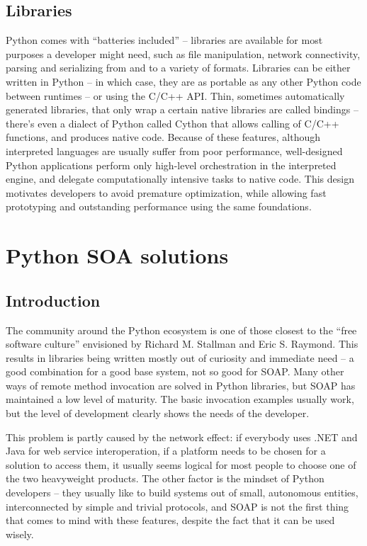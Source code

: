 \subsection{Libraries}

Python comes with ``batteries included'' -- libraries are available for most purposes a developer might need, such as file manipulation, network connectivity, parsing and serializing from and to a variety of formats. Libraries can be either written in Python -- in which case, they are as portable as any other Python code between runtimes -- or using the C/C++ API. Thin, sometimes automatically generated libraries, that only wrap a certain native libraries are called bindings -- there's even a dialect of Python called Cython that allows calling of C/C++ functions, and produces native code. Because of these features, although interpreted languages are usually suffer from poor performance, well-designed Python applications perform only high-level orchestration in the interpreted engine, and delegate computationally intensive tasks to native code. This design motivates developers to avoid premature optimization, while allowing fast prototyping and outstanding performance using the same foundations.

\section{Python SOA solutions}

\subsection{Introduction}

The community around the Python ecosystem is one of those closest to the ``free software culture'' envisioned by Richard M. Stallman and Eric S. Raymond. This results in libraries being written mostly out of curiosity and immediate need -- a good combination for a good base system, not so good for SOAP. Many other ways of remote method invocation are solved in Python libraries, but SOAP has maintained a low level of maturity. The basic invocation examples usually work, but the level of development clearly shows the needs of the developer.

This problem is partly caused by the network effect: if everybody uses .NET and Java for web service interoperation, if a platform needs to be chosen for a solution to access them, it usually seems logical for most people to choose one of the two heavyweight products. The other factor is the mindset of Python developers -- they usually like to build systems out of small, autonomous entities, interconnected by simple and trivial protocols, and SOAP is not the first thing that comes to mind with these features, despite the fact that it can be used wisely.

